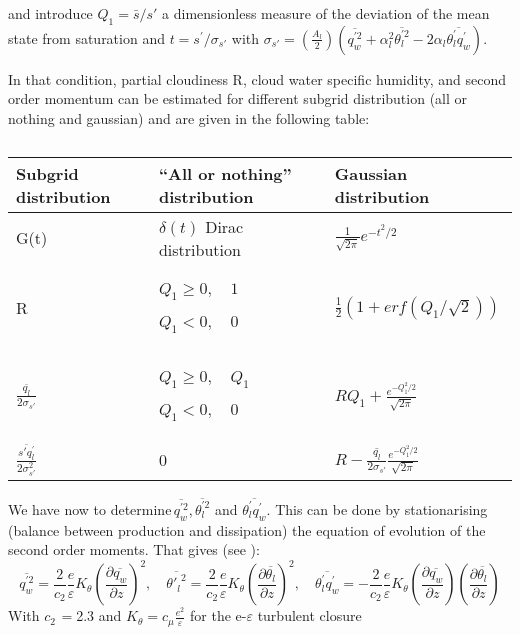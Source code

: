 and introduce $Q_{1}=\bar{s}/s'$ a dimensionless measure of the deviation of
the mean state from saturation and $t=s^{'}/\sigma_{s'}$ with $\sigma
_{s'}=(\frac{A_{l}}{2})(\overline{q_{w}^{'2}}+\alpha_{l}^{2}\overline{\theta
_{l}^{'2}}-2\alpha_{l}\overline{\theta_{l}^{'}q_{w}^{'}})$.

In that condition, partial cloudiness R, cloud water specific humidity, and
second order momentum can be estimated for different subgrid distribution
(all or nothing and gaussian) and are given in the following table:

\begin{table}[htbp]
\begin{center}
\caption[distribution]{}
\begin{tabular}{|p{99pt}|p{177pt}|p{184pt}|}
\hline
Subgrid distribution&
``All or nothing'' distribution&
Gaussian distribution \\
\hline
G(t)&
$\delta (t)$ Dirac distribution&
$\frac{1}{\sqrt {2\pi } }e^{-t^{2}/2}$ \\
\hline
R&
$Q_{1}\ge 0,\quad 1$ \par $Q_{1}<0,\quad 0$&
$\frac{1}{2}\left(1+erf\left(Q_{1}/\sqrt 2 \right) \right)$ \\
\hline
$\frac{\overline{q_{l}}}{2\sigma_{s'}}$&
$Q_{1}\ge 0,\quad Q_{1}$ \par $Q_{1}<0,\quad 0$&
$RQ_{1}+\frac{e^{-Q_{1}^{2}/2}}{\sqrt {2\pi } }$ \\
\hline
$
\frac{\overline{s'q_{l}^{'}}}{2\sigma_{s'}^{2}}
$
&
0&
$R-\frac{\bar{q_{l}}}{2\sigma_{s'}}\frac{e^{-Q_{1}^{2}/2}}{\sqrt {2\pi } }$\\
\hline
\end{tabular}
\label{tab3}
\end{center}
\end{table}

We have now to determine$\, \overline{q_{w}^{'2}}$,$\, \overline{\theta_{l}^{'2}}$
and $\overline{\theta_{l}^{'}q_{w}^{'}}$. This can be done by stationarising
(balance between production and dissipation) the equation of evolution of
the second order moments. That gives (see \cite{Musson-Genon:1995}):
\begin{equation}
\overline{q_{w}^{'2}}=\frac{2}{c_{2}}\frac{e}{\varepsilon }K_{\theta }\left(
\frac{\partial \overline {q_{w}}}{\partial z} \right)^{2}{,\quad
\overline{{\theta'_{l}}^{2}}}=\frac{2}{c_{2}}\frac{e}{\varepsilon }K_{\theta }\left(
\frac{\partial \overline{\theta_{l}}}{\partial z} \right)^{2},\quad
\overline{\theta_{l}^{'}q_{w}^{'}}=-\frac{2}{c_{2}}\frac{e}{\varepsilon }K_{\theta }{\left(
\frac{\partial \overline {q_{w}}}{\partial z} \right)\left( \frac{\partial
\overline{\theta_{l}}}{\partial z} \right)}
\end{equation}
With $c_{2\, }=$2.3 and $K_{\theta }=c_{\mu }\frac{e^{2}}{\varepsilon }$
for the e-$\varepsilon $ turbulent closure

